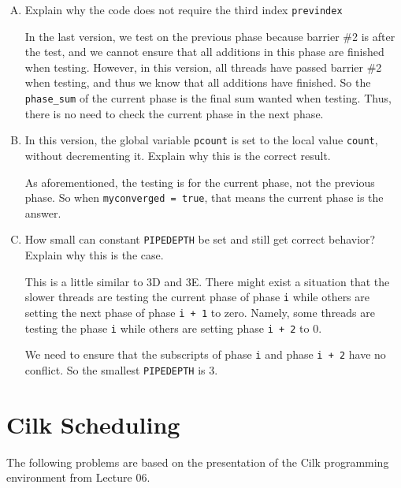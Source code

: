 \documentclass[11pt]{article}
\newenvironment{choice}{\begin{enumerate}[A.]}{\end{enumerate}}
\newenvironment{answer}{\begin{minipage}[c][1.5in]{\textwidth}}{\end{minipage}}
\begin{document}
\begin{choice}
\item Explain why the code does not require the third index \texttt{previndex}

\begin{answer}
In the last version, we test on the previous phase because barrier \#2 is after the test, and we cannot ensure that all additions in this phase are finished when testing. 
However, in this version, all threads have passed barrier \#2 when testing, and thus we know that all additions have finished. 
So the \lstinline{phase_sum} of the current phase is the final sum wanted when testing. Thus, there is no need to check the current phase in the next phase. 
\end{answer}
\item In this version, the global variable \texttt{pcount} is set to
  the local value \texttt{count}, without decrementing it.  Explain
  why this is the correct result.

\begin{answer}
As aforementioned, the testing is for the current phase, not the previous phase. So when \lstinline{myconverged = true}, that means the current phase is the answer. 
\end{answer}
\item How small can constant \texttt{PIPEDEPTH} be set and still get correct behavior?  Explain why this is the case.

\begin{answer}
This is a little similar to 3D and 3E. 
There might exist a situation that the slower threads are testing the current phase of phase \lstinline{i} while others are setting the next phase of phase \lstinline{i + 1} to zero. 
Namely, some threads are testing the phase \lstinline{i} while others are setting phase \lstinline{i + 2} to 0. 

We need to ensure that the subscripts of phase \lstinline{i} and phase \lstinline{i + 2} have no conflict. So the smallest \lstinline{PIPEDEPTH} is 3. 
\end{answer}
\end{choice}

\newpage
\section*{Cilk Scheduling}

The following problems are based on the presentation of the Cilk
programming environment from Lecture 06.
\end{document}
